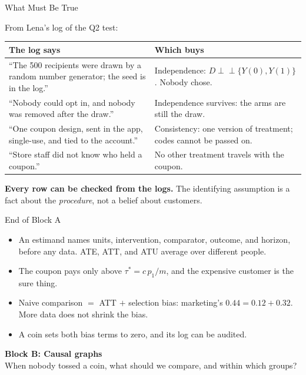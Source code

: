 \documentclass[aspectratio=169, 11pt, handout]{beamer}
\newcommand{\indep}{\perp\!\!\!\perp}
\begin{document}
\begin{frame}{What Must Be True}

From Lena's log of the Q2 test:

\bigskip

\begin{center}
\small
\begin{tabular}{p{6.4cm}p{6.6cm}}
\toprule
\textbf{The log says} & \textbf{Which buys} \\
\midrule
``The 500 recipients were drawn by a random number generator; the seed is in the log.'' & Independence: $D \indep \{Y(0), Y(1)\}$. Nobody chose. \\[0.5em]
``Nobody could opt in, and nobody was removed after the draw.'' & Independence survives: the arms are still the draw. \\[0.5em]
``One coupon design, sent in the app, single-use, and tied to the account.'' & Consistency: one version of treatment; codes cannot be passed on. \\[0.5em]
``Store staff did not know who held a coupon.'' & No other treatment travels with the coupon. \\
\bottomrule
\end{tabular}
\end{center}

\bigskip

\textbf{Every row can be checked from the logs.} The identifying assumption is a fact about the \emph{procedure}, not a belief about customers.
\end{frame}

\begin{frame}{End of Block A}

\begin{itemize}
  \item An estimand names units, intervention, comparator, outcome, and horizon, before any data. ATE, ATT, and ATU average over different people.
  \item The coupon pays only above $\tau^\ast = c\,p_1/m$, and the expensive customer is the sure thing.
  \item Naive comparison $=$ ATT $+$ selection bias: marketing's $0.44 = 0.12 + 0.32$. More data does not shrink the bias.
  \item A coin sets both bias terms to zero, and its log can be audited.
\end{itemize}

\vfill

\begin{center}
\Large \textbf{Block B: Causal graphs}\\[0.4em]
\normalsize When nobody tossed a coin, what should we compare, and within which groups?
\end{center}
\vfill
\end{frame}
\end{document}
